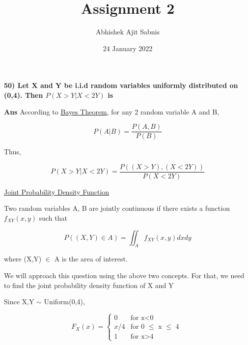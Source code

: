 \documentclass{article}
\title{\textbf{Assignment 2}}
\author{Abhishek Ajit Sabnis}
\date{24 January 2022}
\begin{document}
\maketitle

\textbf{50) Let X and Y be i.i.d random variables uniformly distributed on (0,4). Then $P(X>Y|X<2Y)$ is}

\vspace{0.5cm}

\textbf{Ans} According to \underline{Bayes Theorem}, for any 2 random variable A and B, 

\begin{equation}
    P(A|B) = \frac{P(A,B)}{P(B)}
\end{equation}

Thus, 

\begin{equation}
    P(X>Y|X<2Y) = \frac{P ((X>Y), (X<2Y)) }{P(X<2Y)}
\end{equation}

\vspace{0.2cm}

\underline{Joint Probability Density Function}

\vspace{0.1cm}

Two random variables A, B are jointly continuous if there exists a function $f_{XY} (x,y)$ such that 

\begin{equation}
    P((X,Y) \in A) = \iint_A f_{XY}(x,y) dx dy
\end{equation}

where (X,Y) $\in $ A is the area of interest. 

\vspace{0.2 cm}

We will approach this question using the above two concepts. For that, we need to find the joint probability density function of X and Y

\vspace{0.2cm}

Since X,Y $\sim $ Uniform(0,4), 

\begin{equation}
  F_X(x) =
    \begin{cases}
      0 & \text{for x$<$0}\\
      x/4 & \text{for 0 $\leq$ x $\leq$ 4 }\\
      1 & \text{for x$>$4}
    \end{cases}       
\end{equation}
\end{document}
